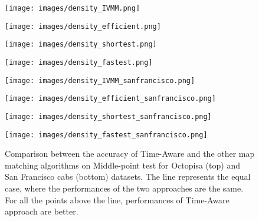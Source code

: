 \documentclass[5p]{elsarticle}
\begin{document}
\begin{figure*}[tb]
\centering
\begin{minipage}[b]{.22\linewidth}
\centering

\texttt{[image: images/density\_IVMM.png]}

\end{minipage}
\quad
\begin{minipage}[b]{.22\linewidth}

\texttt{[image: images/density\_efficient.png]}
\end{minipage}
\quad
\begin{minipage}[b]{.22\linewidth}

\texttt{[image: images/density\_shortest.png]}
\end{minipage}
\quad
\begin{minipage}[b]{.22\linewidth}

\texttt{[image: images/density\_fastest.png]}
\end{minipage}

\begin{minipage}[b]{.22\linewidth}
\centering

\texttt{[image: images/density\_IVMM\_sanfrancisco.png]}

\end{minipage}
\quad
\begin{minipage}[b]{.22\linewidth}

\texttt{[image: images/density\_efficient\_sanfrancisco.png]}
\end{minipage}
\quad
\begin{minipage}[b]{.22\linewidth}

\texttt{[image: images/density\_shortest\_sanfrancisco.png]}
\end{minipage}
\quad
\begin{minipage}[b]{.22\linewidth}

\texttt{[image: images/density\_fastest\_sanfrancisco.png]}
\end{minipage}

\caption{Comparison between the accuracy of Time-Aware and the other map matching algorithms on Middle-point test for Octopisa (top) and San Francisco cabs (bottom) datasets. 
The line represents the equal case, where the performances of the two approaches are the same. For all the points above the line, performances of Time-Aware approach are better.}
\label{middle-point-plot}
\end{figure*}
\end{document}
